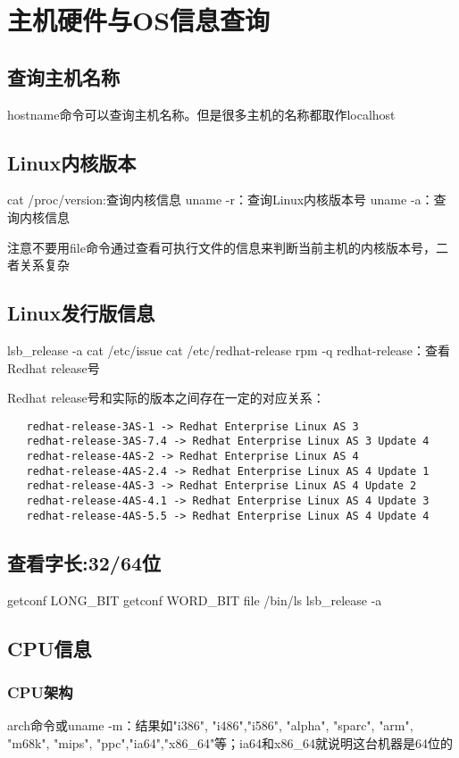 \section{主机硬件与OS信息查询}
\subsection*{查询主机名称}
hostname命令可以查询主机名称。但是很多主机的名称都取作localhost
\subsection*{Linux内核版本}
\begin{shellcmd}
cat /proc/version:查询内核信息
uname -r：查询Linux内核版本号
uname -a：查询内核信息
\end{shellcmd}
注意不要用file命令通过查看可执行文件的信息来判断当前主机的内核版本号，二者关系复杂
\subsection*{Linux发行版信息}
\begin{shellcmd}
lsb_release -a 
cat /etc/issue
cat /etc/redhat-release
rpm -q redhat-release：查看Redhat release号
\end{shellcmd}
Redhat release号和实际的版本之间存在一定的对应关系：
\begin{verbatim}
   redhat-release-3AS-1 -> Redhat Enterprise Linux AS 3
   redhat-release-3AS-7.4 -> Redhat Enterprise Linux AS 3 Update 4
   redhat-release-4AS-2 -> Redhat Enterprise Linux AS 4
   redhat-release-4AS-2.4 -> Redhat Enterprise Linux AS 4 Update 1
   redhat-release-4AS-3 -> Redhat Enterprise Linux AS 4 Update 2
   redhat-release-4AS-4.1 -> Redhat Enterprise Linux AS 4 Update 3
   redhat-release-4AS-5.5 -> Redhat Enterprise Linux AS 4 Update 4 
\end{verbatim} 

\subsection*{查看字长:32/64位}
\begin{shellcmd}
getconf LONG_BIT
getconf WORD_BIT
file /bin/ls
lsb_release -a
\end{shellcmd}
\subsection*{CPU信息}
\subsubsection*{CPU架构}
arch命令或uname -m：结果如"i386", "i486","i586", "alpha", "sparc", "arm", "m68k", 
"mips", "ppc","ia64","x86\_64"等；ia64和x86\_64就说明这台机器是64位的
